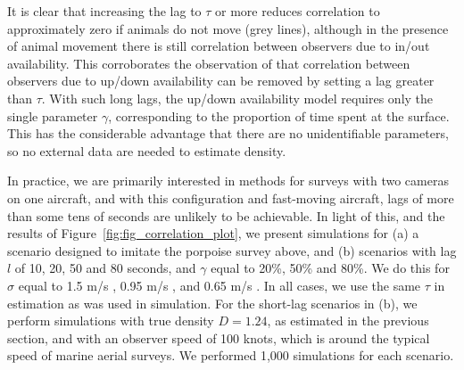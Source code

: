 \documentclass[useAMS, usenatbib, referee]{biom}\usepackage[]{graphicx}\usepackage[]{color}
\begin{document}
It is clear that increasing the lag to $\tau$ or more reduces correlation to approximately zero if animals do not move (grey lines), although in the presence of animal movement there is still correlation between observers due to in/out availability. This corroborates the observation of \cite{Stevenson+al:18} that correlation between observers due to up/down availability can be removed by setting a lag greater than $\tau$. With such long lags, the up/down availability model requires only the single parameter $\gamma$, corresponding to the proportion of time spent at the surface. This has the considerable advantage that there are no unidentifiable parameters, so no external data are needed to estimate density.




In practice, we are primarily interested in methods for surveys with two cameras on one aircraft, and with this configuration and fast-moving aircraft, lags of more than some tens of seconds are unlikely to be achievable. In light of this, and the results of Figure~\ref{fig:fig_correlation_plot}, we present simulations for (a) a scenario designed to imitate the porpoise survey above, and (b) scenarios with lag $l$ of 10, 20, 50 and 80 seconds, and $\gamma$ equal to 20\%, 50\% and 80\%. We do this for $\sigma$ equal to 1.5 m/s \citep[the speed estimated by][]{Hiby+Lovell:98}, 0.95 m/s \citep[the speed estimated by][]{Westgate+al:95}, and 0.65 m/s \citep[a speed lower than that estimated above or by][]{Stevenson+al:18}. In all cases, we use the same $\tau$ in estimation as was used in simulation. For the short-lag scenarios in (b), we perform simulations with true density $D=1.24$, as estimated in the previous section, and with an observer speed of 100 knots, which is around the typical speed of marine aerial surveys. We performed 1,000 simulations for each scenario.
\end{document}
